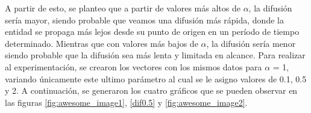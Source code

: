     A partir de esto, se planteo que a partir de valores más altos de $\alpha$, la difusión sería mayor, siendo probable que veamos una difusión más rápida, donde la entidad se propaga más lejos desde su punto de origen en un período de tiempo determinado.
    Mientras que con valores más bajos de $\alpha$, la difusión sería menor siendo probable que la difusión sea más lenta y limitada en alcance.
    Para realizar al experimentación, se crearon los vectores con los mismos datos para $\alpha$ = 1, variando únicamente este ultimo parámetro al cual se le asigno valores de 0.1, 0.5 y 2.
    A continuación, se generaron los cuatro gráficos que se pueden observar en las figuras \ref{fig:awesome_image1}, \ref{dif0.5} y \ref{fig:awesome_image2}.

